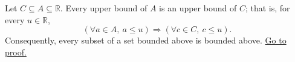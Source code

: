 \begin{lemma}
\label{lem:subsets-preserve-upper-bounds}
Let $C\subseteq A\subseteq\mathbb{R}$. Every upper bound of $A$ is an
upper bound of $C$; that is, for every $u\in\mathbb{R}$,
\[
\left(\forall a\in A,\ a\leq u\right)
\Longrightarrow
(\forall c\in C,\ c\leq u).
\]
Consequently, every subset of a set bounded above is bounded above.
\hyperref[prf:subsets-preserve-upper-bounds]{Go to proof.}
\end{lemma}